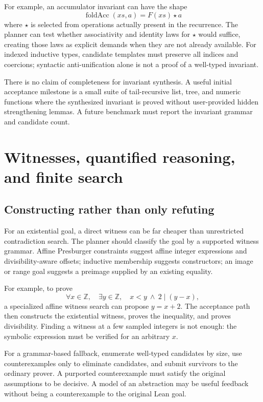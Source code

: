 \documentclass[11pt,letterpaper]{article}
\newcommand{\Lean}{\textsf{Lean}}
\newcommand{\Z}{\mathbb{Z}}
\theoremstyle{definition}
\theoremstyle{remark}
\begin{document}
For example, an accumulator invariant can have the shape
\[
\operatorname{foldAcc}(xs,a)=F(xs)\star a
\]
where $\star$ is selected from operations actually present in the recurrence. The planner can test whether associativity and identity laws for $\star$ would suffice, creating those laws as explicit demands when they are not already available. For indexed inductive types, candidate templates must preserve all indices and coercions; syntactic anti-unification alone is not a proof of a well-typed invariant.

There is no claim of completeness for invariant synthesis. A useful initial acceptance milestone is a small suite of tail-recursive list, tree, and numeric functions where the synthesized invariant is proved without user-provided hidden strengthening lemmas. A future benchmark must report the invariant grammar and candidate count.

\section{Witnesses, quantified reasoning, and finite search}
\subsection{Constructing rather than only refuting}
For an existential goal, a direct witness can be far cheaper than unrestricted contradiction search. The planner should classify the goal by a supported witness grammar. Affine Presburger constraints suggest affine integer expressions and divisibility-aware offsets; inductive membership suggests constructors; an image or range goal suggests a preimage supplied by an existing equality.

For example, to prove
\[
\forall x\in\Z,\quad \exists y\in\Z,\quad x<y\ \land\ 2\mid(y-x),
\]
a specialized affine witness search can propose $y=x+2$. The acceptance path then constructs the existential witness, proves the inequality, and proves divisibility. Finding a witness at a few sampled integers is not enough: the symbolic expression must be verified for an arbitrary $x$.

For a grammar-based fallback, enumerate well-typed candidates by size, use counterexamples only to eliminate candidates, and submit survivors to the ordinary prover. A purported counterexample must satisfy the original assumptions to be decisive. A model of an abstraction may be useful feedback without being a counterexample to the original \Lean{} goal.
\end{document}
